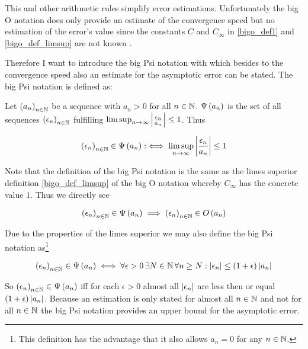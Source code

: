 This and other arithmetic rules simplify error estimations. Unfortunately the big O notation does only provide an estimate of the convergence speed but no estimation of the error's value since the constants $C$ and $C_\infty$ in \eqref{bigo_def1} and \eqref{bigo_def_limsup} are not known .

Therefore I want to introduce the big Psi notation with which besides to the convergence speed also an estimate for the asymptotic error can be stated. The big Psi notation is defined as:

\begin{definition}
  Let $\left({a_n}\right)_{{n}\in\mathbb N}$ be a sequence with $a_n > 0$ for all $n\in\mathbb N$. $\Psi\left( {a_n} \right)$ is the set of all sequences $\left({\epsilon_n}\right)_{{n}\in\mathbb N}$ fulfilling $\limsup_{n\to\infty} \left|{\frac{\epsilon_n}{a_n}}\right| \le 1$. Thus

  \begin{align}
    \left({\epsilon_n}\right)_{{n}\in\mathbb N} \in \Psi\left( {a_n} \right) :\iff \limsup_{n\to\infty} \left|{\frac{\epsilon_n}{a_n}}\right| \le 1
  \end{align}

\end{definition}

Note that the definition of the big Psi notation is the same as the limes superior definition \eqref{bigo_def_limsup} of the big O notation whereby $C_\infty$ has the concrete value $1$. Thus we directly see

\begin{align}
  \left({\epsilon_n}\right)_{{n}\in\mathbb N} \in \Psi\left( {a_n} \right) \implies \left({\epsilon_n}\right)_{{n}\in\mathbb N} \in O\left( {a_n} \right)
\end{align}

\noindent Due to the properties of the limes superior we may also define the big Psi notation as\footnote{This definition has the advantage that it also allows $a_n=0$ for any $n\in\mathbb N$.} 

\begin{align}
  \left({\epsilon_n}\right)_{{n}\in\mathbb N} \in \Psi\left( {a_n} \right) \iff \forall \epsilon > 0\, \exists N \in \mathbb N\, \forall n\ge N: \left|{\epsilon_n}\right| \le (1+\epsilon)\left|{a_n}\right|
\end{align}

So $\left({\epsilon_n}\right)_{{n}\in\mathbb N}\in\Psi\left( {a_n} \right)$ iff for each $\epsilon > 0$ almost all $\left|{\epsilon_n}\right|$ are less then or equal $(1+\epsilon)\left|{a_n}\right|$. Because an estimation is only stated for almost all $n\in\mathbb N$ and not for all $n\in\mathbb N$ the big Psi notation provides an upper bound for the asymptotic error.

